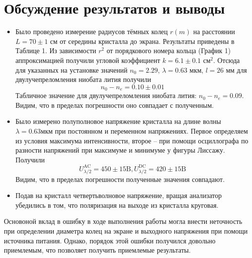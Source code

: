 \documentclass[a4paper,12pt]{article} %
\begin{document}
\section*{Обсуждение результатов и выводы}
\begin{itemize}

\item Было проведено измерение радиусов тёмных колец $r(m)$ на расстоянии $L = 70 \pm 1 $ см от середины кристалла до экрана. Результаты приведены в Таблице 1. Из зависимости $r^2$ от порядкового номера кольца (График 1) аппроксимацией получили угловой коэффициент $k = 6.1 \pm 0.1 \text{ см}^2$. Отсюда для указанных на установке значений $n_0 = 2.29$, $\lambda = 0.63 \text{ мкм}$, $l = 26 \text{ мм}$ для двулучепреломления ниобата лития получили
\[
\boxed{n_0 - n_e = 0.10 \pm 0.01}
\]  
Табличное значение для двулучепреломления ниобата лития: $n_0 - n_e = 0.09$. Видим, что в пределах погрешности оно совпадает с полученным.

\item Было измерено полуполновое напряжение кристалла на длине волны $\lambda = 0.63 \text{мкм}$ при постоянном и переменном напряжениях. Первое определяем из условия максимума интенсивности, второе -- при помощи осциллографа по разности напряжений при максимуме и минимуме у фигуры Лиссажу. Получили 
\[
\boxed{U_{\lambda / 2}^{\text{AC}} = 450 \pm 15 \text{B}},
\boxed{U_{\lambda / 2}^{\text{DC}} = 420 \pm 15 \text{B}}
\]
Видим, что в пределах погрешности полученные значения совпадают.

\item Подав на кристалл четвертьволновое напряжение, вращая анализатор убедились в том, что поляризация на выходе из кристалла круговая.

\end{itemize}

Основоной вклад в ошибку в ходе выполнения работы могла внести неточность при определении диаметра колец на экране и выходного напряжения при помощи источника питания. Однако, порядок этой ошибки получился довольно приемлемым, что позволяет получить приемлемые результаты.
\end{document}
